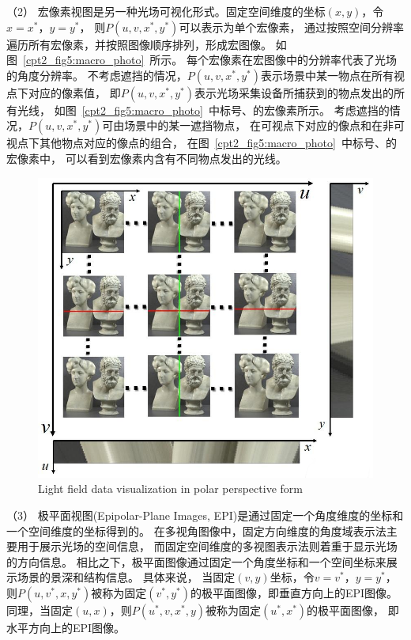 %
%
%
%
（2）
宏像素视图是另一种光场可视化形式。固定空间维度的坐标$(x, y)$，令$x=x^{*}$，$y=y^{*}$，
则$ P(u, v, x^{*}, y^{*})$可以表示为单个宏像素，
通过按照空间分辨率遍历所有宏像素，并按照图像顺序排列，形成宏图像。
如图~\ref{cpt2_fig5:macro_photo}~所示。
每个宏像素在宏图像中的分辨率代表了光场的角度分辨率。
%
不考虑遮挡的情况，$ P(u, v, x^{*}, y^{*})$表示场景中某一物点在所有视点下对应的像素值，
即$ P(u, v, x^{*}, y^{*})$表示光场采集设备所捕获到的物点发出的所有光线，
如图~\ref{cpt2_fig5:macro_photo}~中标号、的宏像素所示。
考虑遮挡的情况，$ P(u, v, x^{*}, y^{*})$可由场景中的某一遮挡物点，
在可视点下对应的像点和在非可视点下其他物点对应的像点的组合，
在图~\ref{cpt2_fig5:macro_photo}~中标号、的宏像素中，
可以看到宏像素内含有不同物点发出的光线。\par
%
%
%
%
%
\begin{figure}[!ht]
	\centering
	\includegraphics[width=0.75\linewidth]{figures/chapter2/epi_photos}
	{Light field data visualization in polar perspective form}  
	\label{cpt2_fig6:epi_photos}
\end{figure}
%
%
%
（3）
极平面视图(Epipolar-Plane Images, EPI)是通过固定一个角度维度的坐标和一个空间维度的坐标得到的。
在多视角图像中，固定方向维度的角度域表示法主要用于展示光场的空间信息，
而固定空间维度的多视图表示法则着重于显示光场的方向信息。
相比之下，极平面图像通过固定一个角度坐标和一个空间坐标来展示场景的景深和结构信息。
具体来说，
当固定$(v, y)$坐标，令$v=v^{*}$，$y=y^{*}$，
则$ P(u, v^{*}, x, y^{*})$被称为固定$(v^{*}, y^{*})$的极平面图像，即垂直方向上的EPI图像。
同理，当固定$(u, x)$，则$ P(u^{*}, v, x^{*}, y)$被称为固定$(u^{*}, x^{*})$的极平面图像，
即水平方向上的EPI图像。
